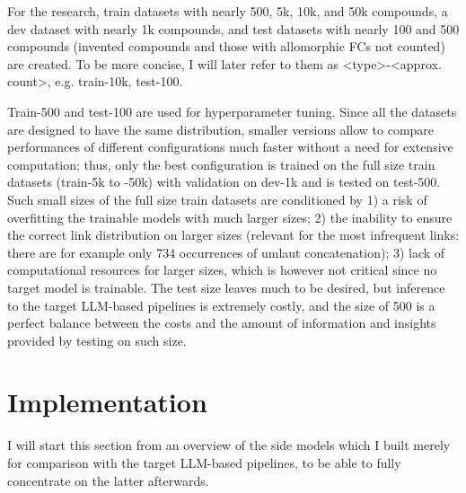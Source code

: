 \documentclass[11pt]{article}
\begin{document}
For the research, train datasets with nearly 500, 5k, 10k, and 50k compounds, a dev dataset with nearly 1k compounds, and test datasets with nearly 100 and 500 compounds (invented compounds and those with allomorphic FCs not counted) are created. To be more concise, I will later refer to them as <type>-<approx. count>, e.g. train-10k, test-100.

Train-500 and test-100 are used for hyperparameter tuning. Since all the datasets are designed to have the same distribution, smaller versions allow to compare performances of different configurations much faster without a need for extensive computation; thus, only the best configuration is trained on the full size train datasets (train-5k to -50k) with validation on dev-1k and is tested on test-500. Such small sizes of the full size train datasets are conditioned by 1) a risk of overfitting the trainable models with much larger sizes; 2) the inability to ensure the correct link distribution on larger sizes (relevant for the most infrequent links: there are for example only 734 occurrences of umlaut concatenation); 3) lack of computational resources for larger sizes, which is however not critical since no target model is trainable. The test size leaves much to be desired, but inference to the target LLM-based pipelines is extremely costly, and the size of 500 is a perfect balance between the costs and the amount of information and insights provided by testing on such size.


\section{Implementation}
\label{sec:implementation}

I will start this section from an overview of the side models which I built merely for comparison with the target LLM-based pipelines, to be able to fully concentrate on the latter afterwards.
\end{document}
